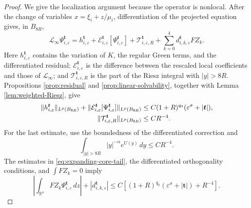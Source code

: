 \documentclass[11pt]{article}
\numberwithin{equation}{section}
\begin{document}
\begin{proof}
We give the localization argument because the operator is nonlocal.
After the change of variables $x=\xi_i+z/\mu_i$, differentiation of
the projected equation gives, in $B_{8R}$,
\begin{equation}\label{eq:expanding-core-equation}
\mathcal L_\infty\Psi_{i,\varepsilon}^{\boldsymbol t}
=h_{i,\varepsilon}^{\boldsymbol t}
+\mathcal E_{i,\varepsilon}^{\boldsymbol t}
[\Psi_{i,\varepsilon}^{\boldsymbol t}]
+\mathcal T_{i,\varepsilon,R}^{\boldsymbol t}
+\sum_{k=0}^4d_{i,k,\varepsilon}^{\boldsymbol t}FZ_k.
\end{equation}
Here $h_{i,\varepsilon}^{\boldsymbol t}$ contains the variation of
$K$, the regular Green terms, and the differentiated residual;
$\mathcal E_{i,\varepsilon}^{\boldsymbol t}$ is the difference
between the rescaled local coefficients and those of
$\mathcal L_\infty$; and $\mathcal T_{i,\varepsilon,R}^{\boldsymbol t}$
is the part of the Riesz integral with $|y|>8R$. Propositions
\ref{prop:residual} and \ref{prop:linear-solvability}, together with
Lemma \ref{lem:weighted-Riesz}, give
\begin{align}
\|h_{i,\varepsilon}^{\boldsymbol t}\|_{L^p(B_{8R})}
+\|\mathcal E_{i,\varepsilon}^{\boldsymbol t}
[\Psi_{i,\varepsilon}^{\boldsymbol t}]\|_{L^p(B_{8R})}
&\leq C(1+R)^{q_0}
(\varepsilon^\sigma+|\boldsymbol t|),
\notag\\
\|\mathcal T_{i,\varepsilon,R}^{\boldsymbol t}\|_{L^p(B_{8R})}
&\leq CR^{-4}.
\label{eq:expanding-core-tail}
\end{align}
For the last estimate, use the boundedness of the differentiated
correction and
\[
\int_{|y|>8R}|y|^{-\alpha}e^{U(y)}\,dy\leq CR^{-4}.
\]
The estimates in \eqref{eq:expanding-core-tail}, the differentiated
orthogonality conditions, and $\int FZ_k=0$ imply
\begin{equation}\label{eq:expanding-core-moments}
\left|\int_{\mathbb R^4}FZ_k
\Psi_{i,\varepsilon}^{\boldsymbol t}\,dz\right|
+|d_{i,k,\varepsilon}^{\boldsymbol t}|
\leq C\left[(1+R)^{q_0}
(\varepsilon^\sigma+|\boldsymbol t|)+R^{-4}\right].
\end{equation}


\end{proof}
\end{document}
